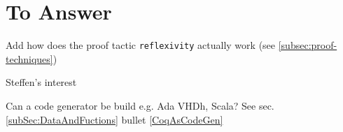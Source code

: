 \section{To Answer}

Add how does the proof tactic \lstinline!reflexivity! actually work \label{sec:reflexivity} (see \ref{subsec:proof-techniques})

Steffen's interest

Can a code generator be build e.g. Ada VHDh, Scala? See sec. \ref{subSec:DataAndFuctions} bullet \ref{CoqAsCodeGen}